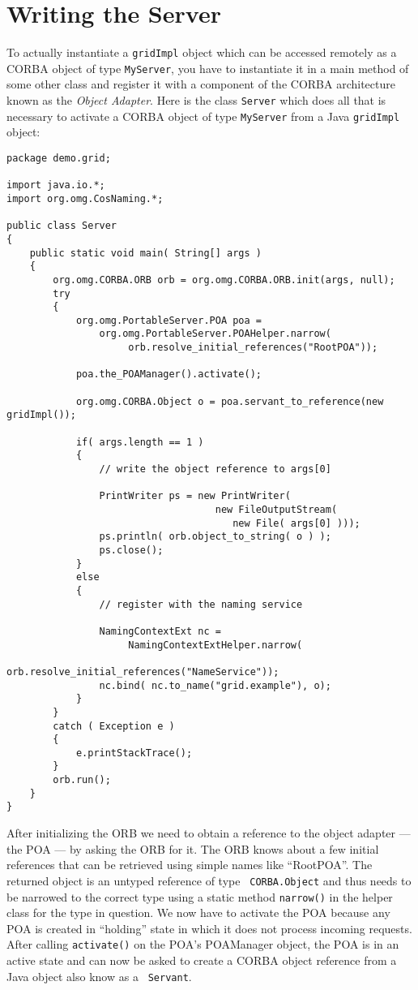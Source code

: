 \section{Writing the Server}

To actually instantiate a {\tt  gridImpl} object which can be accessed
remotely  as  a CORBA  object  of type  {\tt  MyServer},  you have  to
instantiate it  in a main method  of some other class  and register it
with a  component of the CORBA  architecture known as  the {\it Object
Adapter}. Here is  the class {\tt Server} which  does all that is
necessary to  activate a  CORBA object of  type {\tt MyServer}  from a
Java {\tt gridImpl} object:

\small{
\begin{verbatim}
package demo.grid;

import java.io.*;
import org.omg.CosNaming.*;

public class Server
{
    public static void main( String[] args )
    {
        org.omg.CORBA.ORB orb = org.omg.CORBA.ORB.init(args, null);
        try
        {
            org.omg.PortableServer.POA poa =
                org.omg.PortableServer.POAHelper.narrow(
                     orb.resolve_initial_references("RootPOA"));

            poa.the_POAManager().activate();

            org.omg.CORBA.Object o = poa.servant_to_reference(new gridImpl());

            if( args.length == 1 )
            {
                // write the object reference to args[0]

                PrintWriter ps = new PrintWriter(
                                    new FileOutputStream(
                                       new File( args[0] )));
                ps.println( orb.object_to_string( o ) );
                ps.close();
            }
            else
            {
                // register with the naming service

                NamingContextExt nc =
                     NamingContextExtHelper.narrow(
                        orb.resolve_initial_references("NameService"));
                nc.bind( nc.to_name("grid.example"), o);
            }
        }
        catch ( Exception e )
        {
            e.printStackTrace();
        }
        orb.run();
    }
}
\end{verbatim}
}

After initializing the ORB we need to obtain a reference to the object
adapter --- the POA --- by asking  the ORB for it. The ORB knows about
a few initial references that can be retrieved using simple names like
``RootPOA''. The returned object is  an untyped reference of type {\tt
CORBA.Object} and thus needs to  be narrowed to the correct type using
a static  method {\tt narrow()}  in the helper  class for the  type in
question. We now  have to activate the POA because  any POA is created
in  ``holding''   state  in  which   it  does  not   process  incoming
requests.  After  calling {\tt  activate()}  on  the POA's  POAManager
object, the POA is in an active state and can now be asked to create a
CORBA  object  reference  from a  Java  object  also  know as  a  {\tt
Servant}.

